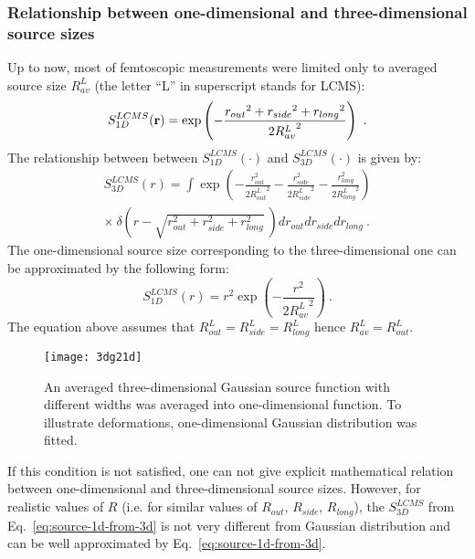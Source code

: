       \subsubsection{Relationship between one-dimensional and three-dimensional source sizes}
      Up to now, most of femtoscopic measurements were limited only to averaged source size $R^L_{av}$ (the letter ``L'' in superscript stands for LCMS):
      \begin{equation}
        S^{LCMS}_{1D} (\mathbf{r}) = \exp \left( - \frac{ {r_{out}}^{2} + {r_{side}}^{2} + {r_{long}}^{2}}{2 {R^{L}_{av}}^2} \right)~.
      \end{equation}
      The relationship between between $S^{LCMS}_{1D}(\cdot)$ and $S^{LCMS}_{3D}(\cdot)$ is given by:
      \begin{equation}
        \begin{split}
        \label{eq:source-1d-from-3d}
        S^{LCMS}_{3D} (r) = \int \exp \left( 
          - \frac{ r_{out}^{2}}{2 {R^L_{out}}^2}
          - \frac{ r_{side}^{2}}{2 {R^L_{side}}^2}
          - \frac{ r_{long}^{2}}{2 {R^L_{long}}^2}
        \right)
        \\ \times~\delta \left(
          r - \sqrt{ r_{out}^{2} + r_{side}^{2} + r_{long}^{2}}
        ~\right)
        d r_{out} d r_{side} d r _{long}~.
        \end{split}
      \end{equation}
      The one-dimensional source size corresponding to the three-dimensional one can be approximated by the following form:
      \begin{equation}
        \label{eq:source-1d-lcms}
        S^{LCMS}_{1D} (r) = {r}^{2} \exp \left( - \frac{r^{2}}{2 {R^L_{av}}^2} \right)~.
      \end{equation}
      The equation above assumes that $R^L_{out} = R^L_{side} = R^L_{long}$ hence $R^L_{av} = R^L_{out}$.
      \begin{figure}[h]
        \centering
        \texttt{[image: 3dg21d]}
        \caption{An averaged three-dimensional Gaussian source function with different widths was averaged into one-dimensional function. To illustrate deformations, one-dimensional Gaussian distribution was fitted.}
        \label{fig:3dgaussian}
      \end{figure}
      If this condition is not satisfied, one can not give explicit mathematical relation between one-dimensional and three-dimensional source sizes.
      However, for realistic values of $R$ (i.e. for similar values of $R_{out}$, $R_{side}$, $R_{long}$), the $S^{LCMS}_{3D}$ from Eq.~\ref{eq:source-1d-from-3d} is not very different from Gaussian distribution and can be well approximated by Eq.~\ref{eq:source-1d-from-3d}.

